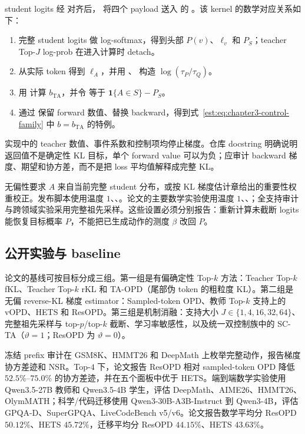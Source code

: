 \documentclass[lang=cn,scheme=chinese,openany]{../book/elegantbook}
\begin{document}
student logits 经  对齐后， 将四个 payload 送入  的 。该 kernel 的数学对应关系如下：
\begin{enumerate}
\item 完整 student logits 做 log-softmax，得到头部 $P(v)$、$\ell_v$ 和 $P_S$；teacher Top-$J$ log-prob 在进入计算时 detach。
\item 从实际 token 得到 $\ell_A$，并用 、 构造 $\log(\tau_P/\tau_Q)$。
\item 用  计算 $b_{\mathrm{TA}}$，并令  等于 $\mathbf 1\{A\in S\}-P_S$。
\item 通过  保留 forward 数值、替换 backward，得到式~\eqref{est:eq:chapter3-control-family} 中 $b=b_{\mathrm{TA}}$ 的特例。
\end{enumerate}
实现中的 teacher 数值、事件系数和控制项均停止梯度。仓库 docstring 明确说明返回值不是确定性 KL 目标，单个 forward value 可以为负；应审计 backward 梯度、期望和协方差，而不是把 loss 平均值解释成完整 KL。

无偏性要求 $A$ 来自当前完整 student 分布，或按 KL 梯度估计章给出的重要性权重校正。发布脚本使用温度 $1$、、。论文的主要数学实验使用温度 $1$、、；全支持审计与跨领域实验采用完整祖先采样。这些设置必须分别报告：重新计算未截断 logits 能恢复目标概率 $P$，不能把已生成动作的测度 $\beta$ 改回 $P$。

\subsection{公开实验与 baseline}

论文的基线可按目标分成三组。第一组是有偏确定性 Top-$k$ 方法：Teacher Top-$k$ fKL、Teacher Top-$k$ rKL 和 TA-OPD（尾部伪 token 的粗粒度 KL）。第二组是无偏 reverse-KL 梯度 estimator：Sampled-token OPD、教师 Top-$k$ 支持上的 vOPD、HETS 和 ResOPD。第三组是机制消融：支持大小 $J\in\{1,4,16,32,64\}$、完整祖先采样与 top-$p$/top-$k$ 截断、学习率敏感性，以及统一双控制族中的 SC-TA（$\vartheta=1$；ResOPD 为 $\vartheta=0$）。

冻结 prefix 审计在 GSM8K、HMMT26 和 DeepMath 上枚举完整动作，报告梯度协方差迹和 NSR。Top-$4$ 下，论文报告 ResOPD 相对 sampled-token OPD 降低 $52.5\%$--$75.0\%$ 的协方差迹，并在五个面板中优于 HETS。端到端数学实验使用 Qwen3.5-27B 教师和 Qwen3.5-4B 学生，评估 DeepMath、AIME26、HMMT26、OlymMATH；科学/代码迁移使用 Qwen3-30B-A3B-Instruct 到 Qwen3-4B，评估 GPQA-D、SuperGPQA、LiveCodeBench v5/v6。论文报告数学平均分 ResOPD $50.12\%$、HETS $45.72\%$，迁移平均分 ResOPD $44.15\%$、HETS $43.63\%$。
\end{document}
